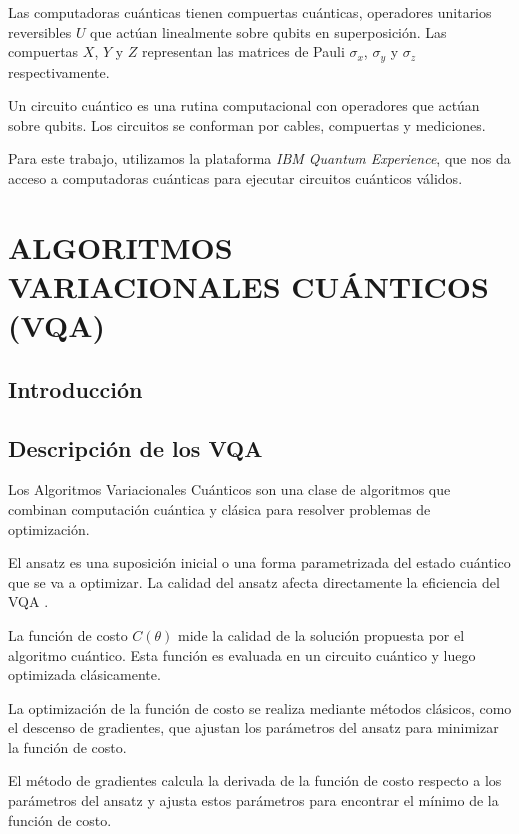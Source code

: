 \documentclass[letterpaper,12pt]{thesisECFM}
\theoremstyle{plain}
\theoremstyle{definition}
\theoremstyle{remark}
\newcommand{\1}{\mathbb{1}}
\begin{document}
Las computadoras cuánticas tienen compuertas cuánticas, operadores unitarios reversibles $U$ que actúan linealmente sobre qubits en superposición. Las compuertas $X$, $Y$ y $Z$ representan las matrices de Pauli $\sigma_x$, $\sigma_y$ y $\sigma_z$ respectivamente. \par 

Un circuito cuántico es una rutina computacional con operadores que actúan sobre qubits. Los circuitos se conforman por cables, compuertas y mediciones. \par 

Para este trabajo, utilizamos la plataforma \textit{IBM Quantum Experience}, que nos da acceso a computadoras cuánticas para ejecutar circuitos cuánticos válidos. \par  
\chapter{ALGORITMOS VARIACIONALES CUÁNTICOS (VQA)} %
\section{Introducción}
\section{Descripción de los VQA}
Los Algoritmos Variacionales Cuánticos son una clase de algoritmos que combinan computación cuántica y clásica para resolver problemas de optimización. \par 

El ansatz es una suposición inicial o una forma parametrizada del estado cuántico que se va a optimizar. La calidad del ansatz afecta directamente la eficiencia del VQA . \par 

La función de costo $C(\theta)$ mide la calidad de la solución propuesta por el algoritmo cuántico. Esta función es evaluada en un circuito cuántico y luego optimizada clásicamente. \par 

La optimización de la función de costo se realiza mediante métodos clásicos, como el descenso de gradientes, que ajustan los parámetros del ansatz para minimizar la función de costo. \par 
 
El método de gradientes calcula la derivada de la función de costo respecto a los parámetros del ansatz y ajusta estos parámetros para encontrar el mínimo de la función de costo. \par 
\end{document}
